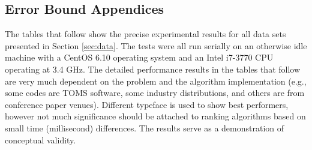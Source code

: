 \documentclass[doublespace,nopageskip]{VTthesis} %
\begin{document}
\begin{appendices}
  \chapter{Error Bound Appendices} \label{app:error}

  The tables that follow show the precise experimental results for all
  data sets presented in Section \ref{sec:data}. The tests were all run
  serially on an otherwise idle machine with a CentOS 6.10 operating
  system and an Intel i7-3770 CPU operating at 3.4 GHz. The detailed
  performance results in the tables that follow are very much dependent
  on the problem and the algorithm implementation (e.g., some codes are
  TOMS software, some industry distributions, and others are from
  conference paper venues). Different typeface is used to show best
  performers, however not much significance should be attached to
  ranking algorithms based on small time (millisecond) differences. The
  results serve as a demonstration of conceptual validity.


\end{appendices}
\end{document}
